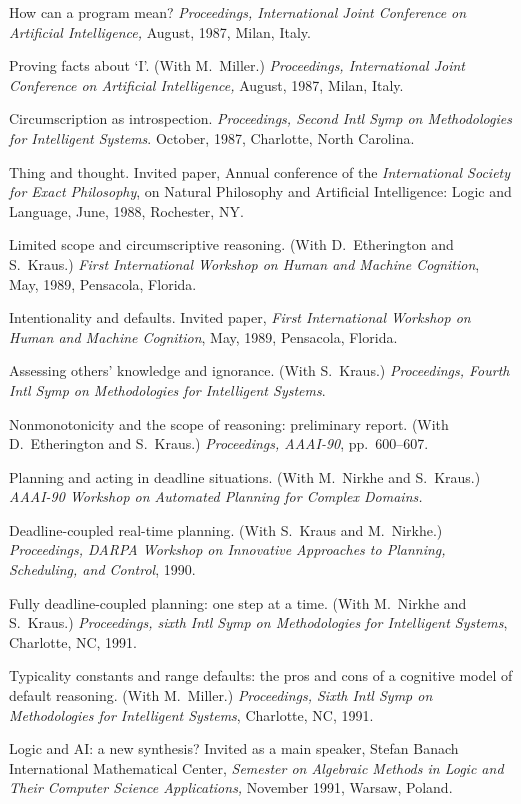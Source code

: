 \paper
How can a program mean?
{\sl Proceedings, International Joint Conference on Artificial Intelligence,}
August, 1987, Milan, Italy.

\paper
Proving facts about `I'.
(With M.~Miller.)
{\sl Proceedings, International Joint Conference on Artificial Intelligence,}
August, 1987, Milan, Italy.

\paper
Circumscription as introspection.
{\sl Proceedings, Second Intl Symp on Methodologies for Intelligent Systems}.
October, 1987, Charlotte, North Carolina.

\paper
Thing and thought.
Invited paper,
Annual conference of the
{\sl International Society for Exact Philosophy},
on Natural Philosophy and Artificial Intelligence: Logic and Language,
June, 1988, Rochester, NY.

\paper
Limited scope and circumscriptive reasoning.
(With D.~Etherington and S.~Kraus.)
{\sl First International Workshop on Human and Machine
Cognition},
May, 1989, Pensacola, Florida.

\paper
Intentionality and defaults.
Invited paper,
{\sl First International Workshop on Human and Machine
Cognition},
May, 1989, Pensacola, Florida.

\paper
Assessing others' knowledge and ignorance.
(With S.~Kraus.)
{\sl Proceedings, Fourth
Intl Symp on Methodologies for Intelligent Systems}.

\paper
Nonmonotonicity and the scope of reasoning: preliminary report.
(With D.~Etherington and S.~Kraus.)
{\sl Proceedings, AAAI-90}, pp.~600--607.

\paper
Planning and acting in deadline situations.
(With M.~Nirkhe and S.~Kraus.)
{\sl AAAI-90 Workshop on Automated Planning for Complex Domains.}

\paper
Deadline-coupled real-time planning.
(With S.~Kraus and M.~Nirkhe.)
{\sl Proceedings, DARPA Workshop on Innovative Approaches to Planning,
Scheduling, and Control}, 1990.

\paper
Fully deadline-coupled planning: one step at a time.
(With M.~Nirkhe and S.~Kraus.)
{\sl Proceedings, sixth
Intl Symp on Methodologies for Intelligent Systems},
Charlotte, NC, 1991.

\paper
Typicality constants and range defaults: the pros
and cons of a cognitive model of default reasoning.
(With M.~Miller.)
{\sl Proceedings, Sixth
Intl Symp on Methodologies for Intelligent Systems},
Charlotte, NC, 1991.

\paper
Logic and AI: a new synthesis? Invited
as a main speaker, Stefan Banach International Mathematical
Center, {\sl Semester on Algebraic Methods in Logic and Their
Computer Science Applications,} November 1991, Warsaw, Poland.


